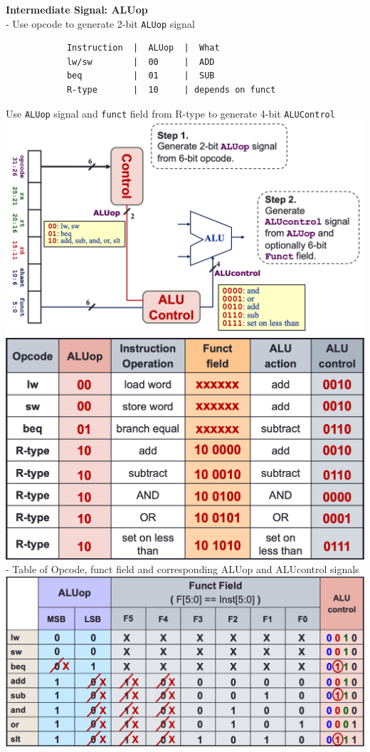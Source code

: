 \documentclass[10pt, a4paper]{article}
\begin{document}
\begin{multicols*}{3}
		\textbf{Intermediate Signal: ALUop}\\
		- Use opcode to generate 2-bit \texttt{ALUop} signal
		\begin{verbatim}
			Instruction  |  ALUop  |  What
			lw/sw        |  00     |  ADD
			beq          |  01     |  SUB
			R-type       |  10     | depends on funct
		\end{verbatim}
		Use \texttt{ALUop} signal and \texttt{funct} field from R-type to generate 4-bit \texttt{ALUControl}\\
		\includegraphics[scale=0.25]{./assets/ALUop}\\
		\includegraphics[scale=0.25]{./assets/ALUControlTable}\\
		- Table of Opcode, funct field and corresponding ALUop and ALUcontrol signals\\
		\includegraphics[scale=.25]{./assets/ALUControlTable2}\\

\end{multicols*}
\end{document}
